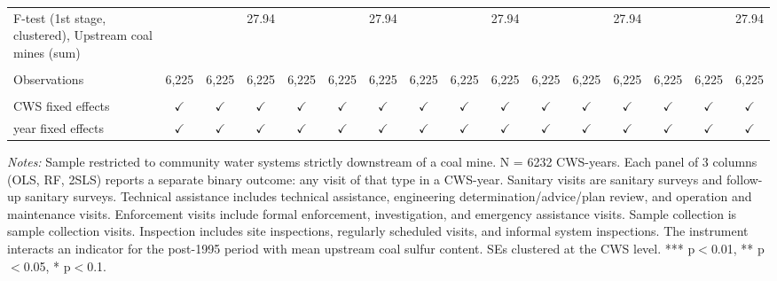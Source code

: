 \begin{table}[htbp]
\begin{adjustbox}{width = \textwidth, center}
\begin{tabular}{lccccccccccccccc}
         F-test (1st stage, clustered), Upstream coal mines (sum) &               &                 & 27.94          &               &               & 27.94         &                &                & 27.94         &               &               & 27.94         &               &               & 27.94\\  
         
          \\
         
         Observations                                             & 6,225         & 6,225           & 6,225          & 6,225         & 6,225         & 6,225         & 6,225          & 6,225          & 6,225         & 6,225         & 6,225         & 6,225         & 6,225         & 6,225         & 6,225\\  
         
          \\
         
         CWS fixed effects                                        & $\checkmark$  & $\checkmark$    & $\checkmark$   & $\checkmark$  & $\checkmark$  & $\checkmark$  & $\checkmark$   & $\checkmark$   & $\checkmark$  & $\checkmark$  & $\checkmark$  & $\checkmark$  & $\checkmark$  & $\checkmark$  & $\checkmark$\\   
         year fixed effects                                       & $\checkmark$  & $\checkmark$    & $\checkmark$   & $\checkmark$  & $\checkmark$  & $\checkmark$  & $\checkmark$   & $\checkmark$   & $\checkmark$  & $\checkmark$  & $\checkmark$  & $\checkmark$  & $\checkmark$  & $\checkmark$  & $\checkmark$\\   
         
         \bottomrule
         
      \end{tabular}
      
      
      
   \end{adjustbox}
      {\tiny\linespread{1}\selectfont \par \raggedright 
   \textit{Notes:} Sample restricted to community water systems strictly downstream of a coal mine. N = 6232 CWS-years. Each panel of 3 columns (OLS, RF, 2SLS) reports a separate binary outcome: any visit of that type in a CWS-year. Sanitary visits are sanitary surveys and follow-up sanitary surveys. Technical assistance includes technical assistance, engineering determination/advice/plan review, and operation and maintenance visits. Enforcement visits include formal enforcement, investigation, and emergency assistance visits. Sample collection is sample collection visits. Inspection includes site inspections, regularly scheduled visits, and informal system inspections. The instrument interacts an indicator for the post-1995 period with mean upstream coal sulfur content. SEs clustered at the CWS level. *** p$<$0.01, ** p$<$0.05, * p$<$0.1.}
   
\end{table}


